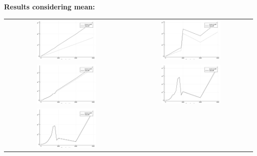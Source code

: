 \documentclass[a4paper,11pt]{article}
\begin{document}
\newpage

\bf{Results considering mean:}\\

\begin{tabular}{cc}
	\includegraphics[width=0.5\textwidth]{perf_mean_3} & 
	\includegraphics[width=0.5\textwidth]{perf_mean_10} \\
	\includegraphics[width=0.5\textwidth]{perf_mean_100} &
	\includegraphics[width=0.5\textwidth]{perf_mean_500} \\
	\includegraphics[width=0.5\textwidth]{perf_mean_1000} &
\end{tabular}
\end{document}
